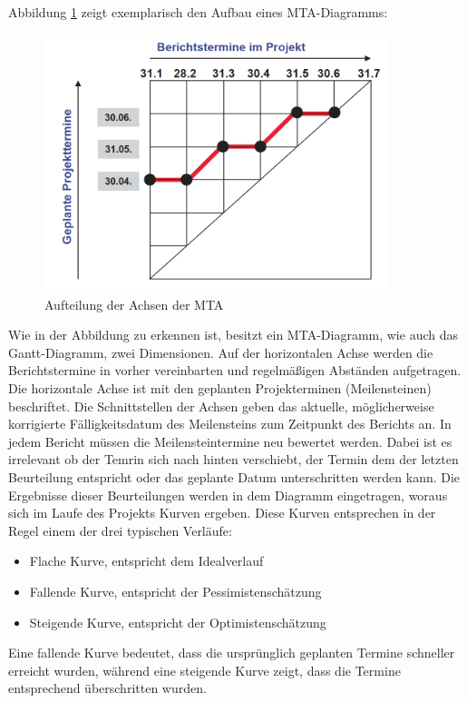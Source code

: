 Abbildung \ref{fig_MTA_aufteilung_achsen} zeigt exemplarisch den Aufbau eines MTA-Diagramms:
\begin{figure}[h!]
	\centering
	\includegraphics[width=10cm]{kapitel/gruppe4_2/bilder/MTA_aufteilung_achsen}
	\caption{Aufteilung der Achsen der MTA}
	\label{fig_MTA_aufteilung_achsen}
\end{figure}

Wie in der Abbildung zu erkennen ist, besitzt ein MTA-Diagramm, wie auch das Gantt-Diagramm, zwei Dimensionen. Auf der horizontalen Achse werden die Berichtstermine in vorher vereinbarten und regelmäßigen Abständen aufgetragen. Die horizontale Achse ist mit den geplanten Projekterminen (Meilensteinen) beschriftet. Die Schnittstellen der Achsen geben das aktuelle, möglicherweise korrigierte Fälligkeitsdatum des Meilensteins zum Zeitpunkt des Berichts an. In jedem Bericht müssen die Meilensteintermine neu bewertet werden. Dabei ist es irrelevant ob der Temrin sich nach hinten verschiebt, der Termin dem der letzten Beurteilung entspricht oder das geplante Datum unterschritten werden kann. Die Ergebnisse dieser Beurteilungen werden in dem Diagramm eingetragen, woraus sich im Laufe des Projekts Kurven ergeben. Diese Kurven entsprechen in der Regel einem der drei typischen Verläufe:

\begin{itemize}
	\item Flache Kurve, entspricht dem Idealverlauf
	\item Fallende Kurve, entspricht der Pessimistenschätzung
	\item Steigende Kurve, entspricht der Optimistenschätzung
\end{itemize}

Eine fallende Kurve bedeutet, dass die ursprünglich geplanten Termine schneller erreicht wurden, während eine steigende Kurve zeigt, dass die Termine entsprechend überschritten wurden.

